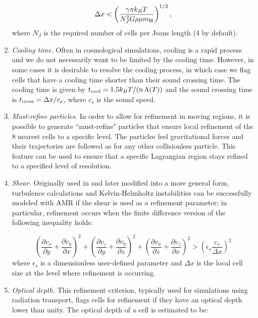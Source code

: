 \begin{enumerate}
\begin{equation}
\Delta x < \left( \frac{\gamma \pi k_B T}{N_J^2 G \rho \mu \mh} \right)^{1/2},
\end{equation}
where $N_J$ is the required number of cells per Jeans length (4 by default).

\item{\em Cooling time.}  Often in cosmological simulations, cooling
  is a rapid process and we do not necessarily want to be limited by
  the cooling time.  However, in some cases it is desirable to resolve
  the cooling process, in which case we flag cells that have a cooling
  time shorter than their sound crossing time.  The cooling time is
  given by $t_{\rm cool} = 1.5 k_BT / (n\, \Lambda(T))$ and the sound
  crossing time is $t_{\rm cross} = \Delta x / c_s$, where $c_s$ is
  the sound speed.


\item{\em Must-refine particles.}  In order to allow for refinement in
  moving regions, it is possible to generate ``must-refine" particles
  that ensure local refinement of the 8 nearest cells to a specific
  level.  The particles feel gravitational forces and their
  trajectories are followed as for any other collisionless particle.
  This feature can be used to ensure that a specific Lagrangian region
  stays refined to a specified level of resolution. 


\item{\em Shear.} Originally used in \citet{Kritsuk06} and later 
  modified into a more general form, turbulence calculations and
  Kelvin-Helmholtz instabilities can be successfully modeled with AMR if 
  the shear is used as a refinement parameter; in particular, refinement 
  occurs when the finite difference version of the following inequality
  holds:

\begin{equation}
\left( \frac{\partial v_x}{\partial y} + \frac{\partial v_y}{\partial x} \right)^2 +
\left( \frac{\partial v_z}{\partial y} + \frac{\partial v_y}{\partial z} \right)^2 +
\left( \frac{\partial v_x}{\partial z} + \frac{\partial v_z}{\partial x} \right)^2
 >  \left(\epsilon_s \frac{c_s}{\Delta x}\right)^2
\end{equation}
where $\epsilon_s$ is a dimensionless user-defined parameter and $\Delta x$ 
is the local cell size at the level where refinement is occurring.

\item{\em Optical depth.} This refinement criterion, typically used
for simulations using radiation transport, flags cells for refinement
if they have an  optical depth lower than unity.  The
optical depth of a cell is estimated to be:


\end{enumerate}
